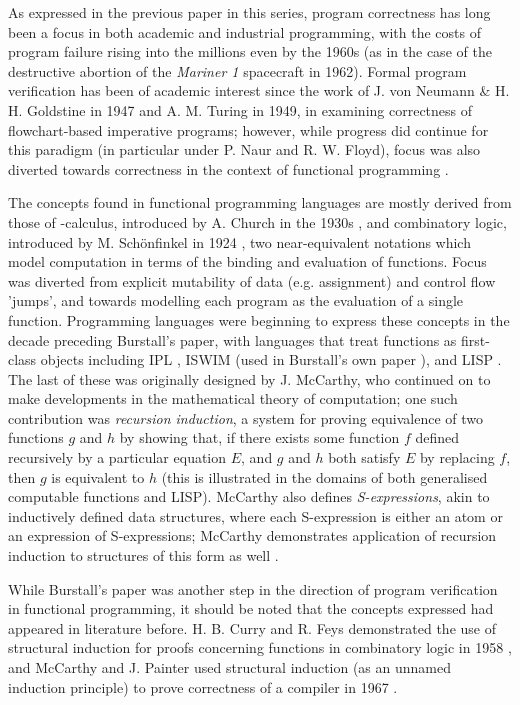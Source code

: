 \documentclass[11pt]{article}
\begin{document}
As expressed in the previous paper in this series, program correctness has long
been a focus in both academic and industrial programming, with the costs of
program failure rising into the millions even by the 1960s (as in the case of
the destructive abortion of the \textit{Mariner 1} spacecraft in 1962). Formal
program verification has been of academic interest since the work of J. von
Neumann \& H. H.  Goldstine in 1947 and A. M. Turing in 1949, in
examining correctness of flowchart-based imperative programs; however, while
progress did continue for this paradigm (in particular under P. Naur and R. W.
Floyd), focus was also diverted towards correctness in the context of functional
programming \cite{olivecc}.
\par
The concepts found in functional programming languages are mostly derived from
those of \textlambda{}-calculus, introduced by A. Church in the 1930s
\cite{church1936unsolvable}, and combinatory logic, introduced by M.
Sch{\"o}nfinkel in 1924 \cite{schonfinkel1924bausteine}, two near-equivalent
notations which model computation in terms of the binding and evaluation of
functions. Focus was diverted from explicit mutability of data (e.g. assignment)
and control flow 'jumps', and towards modelling each program as the
evaluation of a single function. Programming languages were beginning to express
these concepts in the decade preceding Burstall's paper, with languages that
treat functions as first-class objects including IPL \cite{simon1996models},
ISWIM (used in Burstall's own paper \cite{burstall1969proving}), and LISP
\cite{mccarthy1959recursive}. The last of these was originally designed by J.
McCarthy, who continued on to make developments in the mathematical theory of
computation; one such contribution was \textit{recursion induction}, a system
for proving equivalence of two functions \(g\) and \(h\) by showing that, if
there exists some function \(f\) defined recursively by a particular equation
\(E\), and \(g\) and \(h\) both satisfy \(E\) by replacing \(f\), then \(g\) is
equivalent to \(h\) (this is illustrated in the domains of both generalised
computable functions and LISP).  McCarthy also defines \textit{S-expressions},
akin to inductively defined data structures, where each S-expression is either
an atom or an expression of S-expressions; McCarthy demonstrates application of
recursion induction to structures of this form as well \cite{mccarthy1963basis}. 
\par
While Burstall's paper was another step in the direction of program verification
in functional programming, it should be noted that the concepts expressed had
appeared in literature before. H.  B. Curry and R. Feys demonstrated the use of
structural induction for proofs concerning functions in combinatory logic in
1958 \cite{curry1958combinatory}, and McCarthy and J.  Painter used structural
induction (as an unnamed induction principle) to prove correctness of a compiler
in 1967 \cite{mccarthy1967correctness}.
\end{document}
